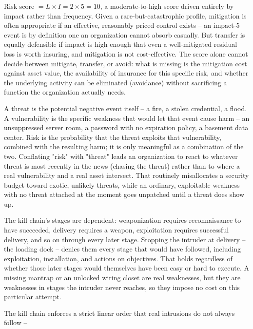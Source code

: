\begin{answerkey}
\item Risk score $= L \times I = 2 \times 5 = 10$, a moderate-to-high score driven entirely by
impact rather than frequency. Given a rare-but-catastrophic profile, mitigation is often
appropriate if an effective, reasonably priced control exists -- an impact-5 event is by definition
one an organization cannot absorb casually. But transfer is equally defensible if impact is high
enough that even a well-mitigated residual loss is worth insuring, and mitigation is not
cost-effective. The score alone cannot decide between mitigate, transfer, or avoid: what is missing
is the mitigation cost against asset value, the availability of insurance for this specific
risk, and whether the underlying activity can be eliminated (avoidance) without sacrificing a
function the organization actually needs.
\item A threat is the potential negative event itself -- a fire, a stolen credential, a flood. A
vulnerability is the specific weakness that would let that event cause harm -- an unsuppressed
server room, a password with no expiration policy, a basement data center. Risk is the probability
that the threat exploits that vulnerability, combined with the resulting harm; it is only
meaningful as a combination of the two. Conflating "risk" with "threat" leads an organization to
react to whatever threat is most recently in the news (chasing the threat) rather than to where a
real vulnerability and a real asset intersect. That routinely misallocates a security budget toward
exotic, unlikely threats, while an ordinary, exploitable weakness with no threat attached at the
moment goes unpatched until a threat does show up.
\item The kill chain's stages are dependent: weaponization requires reconnaissance to have
succeeded, delivery requires a weapon, exploitation requires successful delivery, and so on
through every later stage. Stopping the intruder at delivery -- the loading dock -- denies them
every stage that would have followed, including exploitation, installation, and actions on
objectives. That holds regardless of whether those later stages would themselves have been easy or
hard to execute. A missing mantrap or an unlocked wiring closet are real weaknesses, but they are
weaknesses in stages the intruder never reaches, so they impose no cost on this particular
attempt.
\item The kill chain enforces a strict linear order that real intrusions do not always follow --

\end{answerkey}
